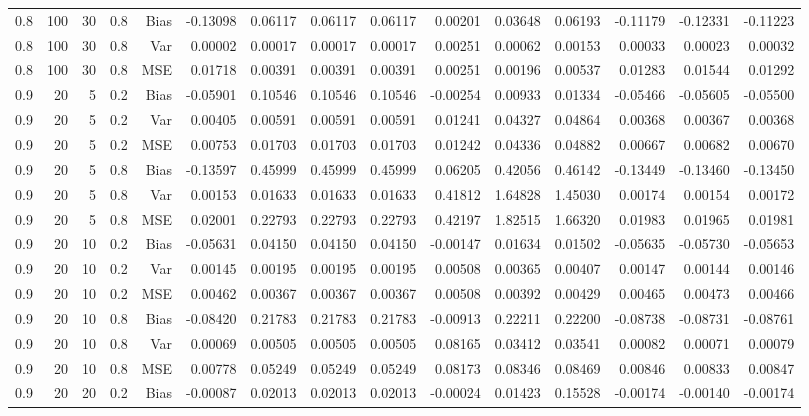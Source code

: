 \begin{table}[!htbp]
\begin{tabular}{lrrrrrrrrrrrrrr}
0.8 & 100 & 30 & 0.8 & Bias & -0.13098 & 0.06117 & 0.06117 & 0.06117 & 0.00201 & 0.03648 & 0.06193 & -0.11179 & -0.12331 & -0.11223 \\
0.8 & 100 & 30 & 0.8 & Var & 0.00002 & 0.00017 & 0.00017 & 0.00017 & 0.00251 & 0.00062 & 0.00153 & 0.00033 & 0.00023 & 0.00032 \\
0.8 & 100 & 30 & 0.8 & MSE & 0.01718 & 0.00391 & 0.00391 & 0.00391 & 0.00251 & 0.00196 & 0.00537 & 0.01283 & 0.01544 & 0.01292 \\
0.9 &  20 &  5 & 0.2 & Bias & -0.05901 & 0.10546 & 0.10546 & 0.10546 & -0.00254 & 0.00933 & 0.01334 & -0.05466 & -0.05605 & -0.05500 \\
0.9 &  20 &  5 & 0.2 & Var & 0.00405 & 0.00591 & 0.00591 & 0.00591 & 0.01241 & 0.04327 & 0.04864 & 0.00368 & 0.00367 & 0.00368 \\
0.9 &  20 &  5 & 0.2 & MSE & 0.00753 & 0.01703 & 0.01703 & 0.01703 & 0.01242 & 0.04336 & 0.04882 & 0.00667 & 0.00682 & 0.00670 \\
0.9 &  20 &  5 & 0.8 & Bias & -0.13597 & 0.45999 & 0.45999 & 0.45999 & 0.06205 & 0.42056 & 0.46142 & -0.13449 & -0.13460 & -0.13450 \\
0.9 &  20 &  5 & 0.8 & Var & 0.00153 & 0.01633 & 0.01633 & 0.01633 & 0.41812 & 1.64828 & 1.45030 & 0.00174 & 0.00154 & 0.00172 \\
0.9 &  20 &  5 & 0.8 & MSE & 0.02001 & 0.22793 & 0.22793 & 0.22793 & 0.42197 & 1.82515 & 1.66320 & 0.01983 & 0.01965 & 0.01981 \\
0.9 &  20 & 10 & 0.2 & Bias & -0.05631 & 0.04150 & 0.04150 & 0.04150 & -0.00147 & 0.01634 & 0.01502 & -0.05635 & -0.05730 & -0.05653 \\
0.9 &  20 & 10 & 0.2 & Var & 0.00145 & 0.00195 & 0.00195 & 0.00195 & 0.00508 & 0.00365 & 0.00407 & 0.00147 & 0.00144 & 0.00146 \\
0.9 &  20 & 10 & 0.2 & MSE & 0.00462 & 0.00367 & 0.00367 & 0.00367 & 0.00508 & 0.00392 & 0.00429 & 0.00465 & 0.00473 & 0.00466 \\
0.9 &  20 & 10 & 0.8 & Bias & -0.08420 & 0.21783 & 0.21783 & 0.21783 & -0.00913 & 0.22211 & 0.22200 & -0.08738 & -0.08731 & -0.08761 \\
0.9 &  20 & 10 & 0.8 & Var & 0.00069 & 0.00505 & 0.00505 & 0.00505 & 0.08165 & 0.03412 & 0.03541 & 0.00082 & 0.00071 & 0.00079 \\
0.9 &  20 & 10 & 0.8 & MSE & 0.00778 & 0.05249 & 0.05249 & 0.05249 & 0.08173 & 0.08346 & 0.08469 & 0.00846 & 0.00833 & 0.00847 \\
0.9 &  20 & 20 & 0.2 & Bias & -0.00087 & 0.02013 & 0.02013 & 0.02013 & -0.00024 & 0.01423 & 0.15528 & -0.00174 & -0.00140 & -0.00174 \\

\end{tabular}
\end{table}
